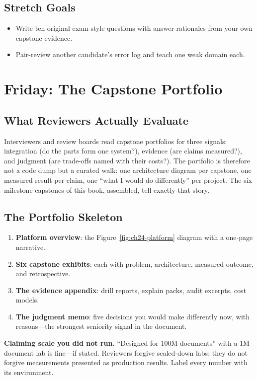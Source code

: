 \subsection*{Stretch Goals}
\begin{itemize}
    \item Write ten original exam-style questions with answer rationales from your own capstone evidence.
    \item Pair-review another candidate's error log and teach one weak domain each.
\end{itemize}

\section{Friday: The Capstone Portfolio}
\subsection{What Reviewers Actually Evaluate}
Interviewers and review boards read capstone portfolios for three signals: integration (do the parts form one system?), evidence (are claims measured?), and judgment (are trade-offs named with their costs?). The portfolio is therefore not a code dump but a curated walk: one architecture diagram per capstone, one measured result per claim, one ``what I would do differently'' per project. The six milestone capstones of this book, assembled, tell exactly that story.

\subsection{The Portfolio Skeleton}
\begin{enumerate}
    \item \textbf{Platform overview}: the Figure~\ref{fig:ch24-platform} diagram with a one-page narrative.
    \item \textbf{Six capstone exhibits}: each with problem, architecture, measured outcome, and retrospective.
    \item \textbf{The evidence appendix}: drill reports, explain packs, audit excerpts, cost models.
    \item \textbf{The judgment memo}: five decisions you would make differently now, with reasons---the strongest seniority signal in the document.
\end{enumerate}

\begin{pitfall}
\textbf{Claiming scale you did not run.} ``Designed for 100M documents'' with a 1M-document lab is fine---if stated. Reviewers forgive scaled-down labs; they do not forgive measurements presented as production results. Label every number with its environment.
\end{pitfall}

